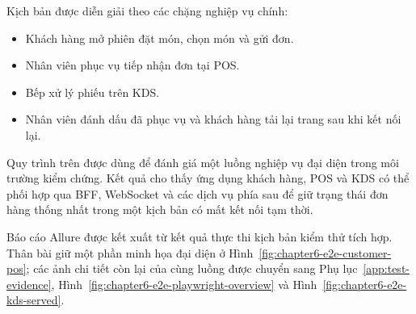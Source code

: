 Kịch bản được diễn giải theo các chặng nghiệp vụ chính:
\begin{itemize}
  \item Khách hàng mở phiên đặt món, chọn món và gửi đơn.
  \item Nhân viên phục vụ tiếp nhận đơn tại POS.
  \item Bếp xử lý phiếu trên KDS.
  \item Nhân viên đánh dấu đã phục vụ và khách hàng tải lại trang sau khi kết nối lại.
\end{itemize}

Quy trình trên được dùng để đánh giá một luồng nghiệp vụ đại diện trong môi trường kiểm chứng. Kết quả cho thấy ứng dụng khách hàng, POS và KDS có thể phối hợp qua BFF, WebSocket và các dịch vụ phía sau để giữ trạng thái đơn hàng thống nhất trong một kịch bản có mất kết nối tạm thời.

Báo cáo Allure được kết xuất từ kết quả thực thi kịch bản kiểm thử tích hợp. Thân bài giữ một phần minh họa đại diện ở Hình~\ref{fig:chapter6-e2e-customer-pos}; các ảnh chi tiết còn lại của cùng luồng được chuyển sang Phụ lục~\ref{app:test-evidence}, Hình~\ref{fig:chapter6-e2e-playwright-overview} và Hình~\ref{fig:chapter6-e2e-kds-served}.

